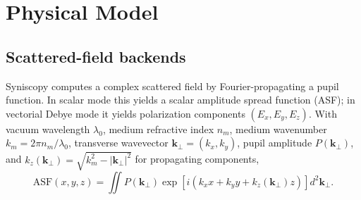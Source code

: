 \section{Physical Model}
\label{sec:physical-model}

\subsection{Scattered-field backends}

Syniscopy computes a complex scattered field by Fourier-propagating a pupil function. In scalar mode this yields a scalar amplitude spread function (ASF); in vectorial Debye mode it yields polarization components $(E_x,E_y,E_z)$. With vacuum wavelength \(\lambda_0\), medium refractive index \(n_m\), medium wavenumber \(k_m=2\pi n_m/\lambda_0\), transverse wavevector $\mathbf{k}_\perp=(k_x,k_y)$, pupil amplitude $P(\mathbf{k}_\perp)$, and $k_z(\mathbf{k}_\perp)=\sqrt{k_m^2-|\mathbf{k}_\perp|^2}$ for propagating components,
\begin{equation}
  \mathrm{ASF}(x,y,z)=
  \iint P(\mathbf{k}_\perp)
  \exp\!\left[i(k_xx+k_yy+k_z(\mathbf{k}_\perp)z)\right]
  d^2\mathbf{k}_\perp .
\end{equation}
